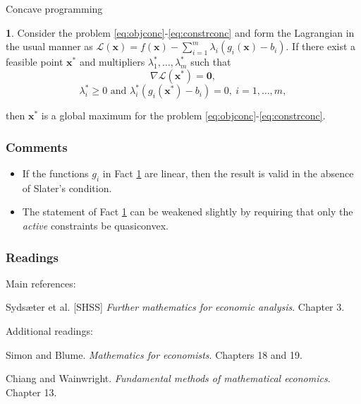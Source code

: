 \documentclass[10pt]{beamer}
\theoremstyle{definition}
\newtheorem{Fact}{\translate{Fact}}
\begin{document}
\begin{section}{Concave programming}
\begin{frame}[fragile]
\begin{Fact}
Consider the problem \eqref{eq:objconc}-\eqref{eq:constrconc} and form the Lagrangian in the usual manner as $ \mathcal{L}(\mathbf{x}) = f(\mathbf{x}) - \sum_{i=1}^{m}\lambda_i (g_i(\mathbf{x})-b_i) $. If there exist a feasible point $ \mathbf{x^*} $ and multipliers $ \lambda_1^*,\ldots,\lambda_m^* $ such that \[ \nabla \mathcal{L}(\mathbf{x^*}) = \mathbf{0}, \]
\[ \lambda_i^* \geq 0 \text{ and } \lambda_i^* (g_i(\mathbf{x^*})-b_i) = 0,~i=1,\ldots,m, \]

then $ \mathbf{x^*} $ is a global maximum for the problem \eqref{eq:objconc}-\eqref{eq:constrconc}.
\label{fc:SCsConcaveConstr}
\end{Fact}
\end{frame}

\begin{frame}[fragile]
\frametitle{Comments}
\begin{itemize}
\item If the functions $ g_i $ in Fact \ref{fc:SCsConcaveConstr} are linear, then the result is valid in the absence of Slater's condition.\bigskip
\item The statement of Fact \ref{fc:SCsConcaveConstr} can be weakened slightly by requiring that only the \emph{active} constraints be quasiconvex.
\end{itemize}
\end{frame}

\end{section}
\begin{frame}[fragile]
\frametitle{Readings}
Main references:

Syds\ae{}ter et al. [SHSS] \emph{Further mathematics for economic analysis}. Chapter 3.\bigskip

Additional readings:

Simon and Blume. \emph{Mathematics for economists}. Chapters 18 and 19.

Chiang and Wainwright. \emph{Fundamental methods of mathematical economics}. Chapter 13.
\end{frame}
\end{document}
